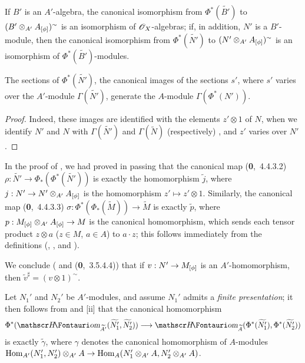 If $B'$ is an $A'$-algebra, the canonical isomorphism from $\Phi^*(\widetilde{B'})$ to $(B'\otimes_{A'}A_{[\phi]})^\sim$ is an isomorphism of $\mathscr{O}_X$-algebras;
if, in addition, $N'$ is a $B'$-module, then the canonical isomorphism from $\Phi^*(\widetilde{N'})$ to $(N'\otimes_{A'}A_{[\phi]})^\sim$ is an isomorphism of $\Phi^*(\widetilde{B'})$-modules.

\begin{corollary}[1.6.6]
\label{I.1.6.6}
The sections of $\Phi^*(\widetilde{N'})$, the canonical images of the sections $s'$, where $s'$ varies over the $A'$-module $\Gamma(\widetilde{N'})$, generate the $A$-module $\Gamma(\Phi^*(N'))$.
\end{corollary}

\begin{proof}
\label{proof-I.1.6.6}
Indeed, these images are identified with the elements $z'\otimes 1$ of $N$, when we identify $N'$ and $N$ with $\Gamma(\widetilde{N'})$ and $\Gamma(\widetilde{N})$ (respectively) , and $z'$ varies over $N'$.
\end{proof}

\begin{env}[1.6.7]
\label{I.1.6.7}
In the proof of , we had proved in passing that the canonical map (\textbf{0},~4.4.3.2) $\rho:\widetilde{N'}\to\Phi_*(\Phi^*(\widetilde{N'}))$ is exactly the homomorphism $\widetilde{j}$,
where $j:N'\to N'\otimes_{A'}A_{[\vphi]}$ is the homomorphism $z'\mapsto z'\otimes 1$.
Similarly, the canonical map (\textbf{0},~4.4.3.3) $\sigma:\Phi^*(\Phi_*(\widetilde{M}))\to\widetilde{M}$ is exactly $\widetilde{p}$, where $p:M_{[\vphi]}\otimes_{A'}A_{[\vphi]}\to M$ is the canonical homomorphism, which sends each tensor product $z\otimes a$ ($z\in M$, $a\in A$) to $a\cdot z$;
this follows immediately from the definitions (, , and ).

We conclude ( and (\textbf{0},~3.5.4.4)) that if $v:N'\to M_{[\vphi]}$ is an $A'$-homomorphism, then $\widetilde{v}^\sharp=(v\otimes 1)^\sim$.
\end{env}

\begin{env}[1.6.8]
\label{I.1.6.8}
Let $N_1'$ and $N_2'$ be $A'$-modules, and assume $N_1'$ admits a \emph{finite presentation};
it then follows from  and [ii] that the
canonical homomorphism 
\[
  \Phi^*(\shHom_{\widetilde{A'}}(\widetilde{N_1'},\widetilde{N_2'}))
  \to\shHom_{\widetilde{A}}(\Phi^*(\widetilde{N_1'}),\Phi^*(\widetilde{N_2'}))
\]
is exactly $\widetilde{\gamma}$, where $\gamma$ denotes the canonical homomorphism of $A$-modules $\Hom_{A'}(N_1',N_2')\otimes_{A'}A\to\Hom_A(N_1'\otimes_{A'}A,N_2'\otimes_{A'}A)$.
\end{env}

